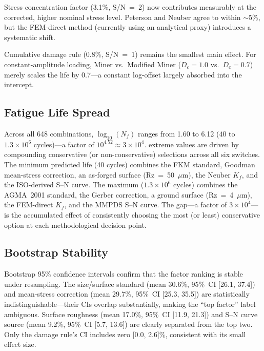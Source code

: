 \documentclass[12pt,a4paper]{article}
\begin{document}
Stress concentration factor (3.1\%, S/N~=~2) now contributes measurably
at the corrected, higher nominal stress level. Peterson and Neuber agree
to within $\sim$5\%, but the FEM-direct method (currently using an
analytical proxy) introduces a systematic shift.

Cumulative damage rule (0.8\%, S/N~=~1) remains the smallest main effect.
For constant-amplitude loading, Miner vs.\ Modified Miner ($D_c=1.0$
vs.\ $D_c=0.7$) merely scales the life by 0.7---a constant log-offset
largely absorbed into the intercept.

\subsection{Fatigue Life Spread}

Across all 648 combinations, $\log_{10}(N_f)$ ranges from 1.60 to 6.12
($40$ to $1.3\times10^6$ cycles)---a factor of $10^{4.52} \approx
3\times10^4$. %
extreme values are driven by compounding conservative (or non-conservative)
selections across all six switches. The minimum predicted life (40 cycles)
combines the FKM standard, Goodman mean-stress correction, an as-forged
surface (Rz~=~50~$\mu$m), the Neuber $K_f$, and the ISO-derived S--N curve.
The maximum ($1.3\times10^6$ cycles) combines the AGMA~2001 standard, the
Gerber correction, a ground surface (Rz~=~4~$\mu$m), the FEM-direct $K_f$,
and the MMPDS S--N curve. The gap---a factor of $3\times10^4$---is the
accumulated effect of consistently choosing the most (or least) conservative
option at each methodological decision point.

\subsection{Bootstrap Stability}

Bootstrap 95\% confidence intervals confirm that the factor ranking is
stable under resampling. The size/surface standard (mean 30.6\%, 95\%~CI
[26.1, 37.4]) and mean-stress correction (mean 29.7\%, 95\%~CI [25.3, 35.5])
are statistically indistinguishable---their CIs overlap substantially,
making the ``top factor'' label ambiguous. Surface roughness (mean 17.0\%,
95\%~CI [11.9, 21.3]) and S--N curve source (mean 9.2\%, 95\%~CI
[5.7, 13.6]) are clearly separated from the top two. Only the damage rule's
CI includes zero [0.0, 2.6]\%, consistent with its small effect size.

\end{document}
